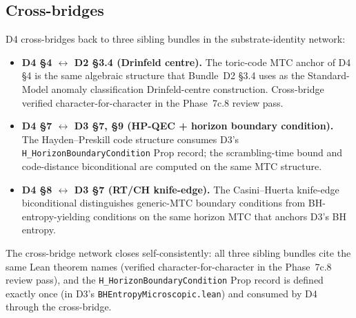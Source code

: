 \documentclass[aps,prd,reprint,nofootinbib,superscriptaddress]{revtex4-2}
\begin{document}
\subsection{Cross-bridges}

D4 cross-bridges back to three sibling bundles in the substrate-identity
network:

\begin{itemize}
\item \textbf{D4 \S 4 $\leftrightarrow$ D2 \S 3.4 (Drinfeld centre).}
  The toric-code MTC anchor of D4 \S 4 is the same algebraic structure
  that Bundle~D2 \S 3.4 uses as the Standard-Model anomaly classification
  Drinfeld-centre construction. Cross-bridge verified character-for-character
  in the Phase~7c.8 review pass.
\item \textbf{D4 \S 7 $\leftrightarrow$ D3 \S 7, \S 9 (HP-QEC + horizon
  boundary condition).} The Hayden--Preskill code structure consumes
  D3's \texttt{H\_HorizonBoundaryCondition} Prop record; the
  scrambling-time bound and code-distance biconditional are computed
  on the same MTC structure.
\item \textbf{D4 \S 8 $\leftrightarrow$ D3 \S 7 (RT/CH knife-edge).}
  The Casini--Huerta knife-edge biconditional distinguishes
  generic-MTC boundary conditions from BH-entropy-yielding conditions
  on the same horizon MTC that anchors D3's BH entropy.
\end{itemize}

The cross-bridge network closes self-consistently: all three sibling
bundles cite the same Lean theorem names (verified
character-for-character in the Phase~7c.8 review pass), and the
\texttt{H\_HorizonBoundaryCondition} Prop record is defined exactly
once (in D3's \texttt{BHEntropyMicroscopic.lean}) and consumed by
D4 through the cross-bridge.
\end{document}
